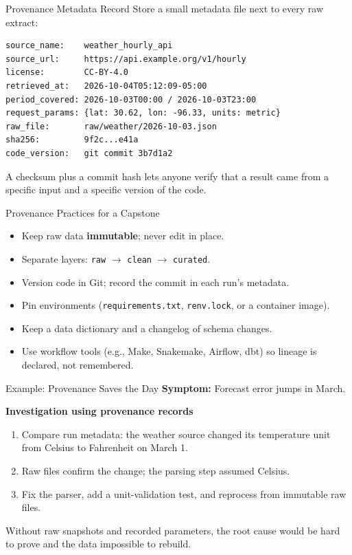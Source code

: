 \documentclass[aspectratio=43,11pt]{beamer}
\begin{document}
\begin{frame}[fragile]{Provenance Metadata Record}
  Store a small metadata file next to every raw extract:

  \medskip
  \footnotesize
\begin{verbatim}
source_name:    weather_hourly_api
source_url:     https://api.example.org/v1/hourly
license:        CC-BY-4.0
retrieved_at:   2026-10-04T05:12:09-05:00
period_covered: 2026-10-03T00:00 / 2026-10-03T23:00
request_params: {lat: 30.62, lon: -96.33, units: metric}
raw_file:       raw/weather/2026-10-03.json
sha256:         9f2c...e41a
code_version:   git commit 3b7d1a2
\end{verbatim}

  \normalsize
  A checksum plus a commit hash lets anyone verify that a result came from a
  specific input and a specific version of the code.
\end{frame}

\begin{frame}{Provenance Practices for a Capstone}
  \begin{itemize}
    \item Keep raw data \textbf{immutable}; never edit in place.
    \item Separate layers: \texttt{raw} $\rightarrow$ \texttt{clean} $\rightarrow$
      \texttt{curated}.
    \item Version code in Git; record the commit in each run's metadata.
    \item Pin environments (\texttt{requirements.txt}, \texttt{renv.lock}, or a
      container image).
    \item Keep a data dictionary and a changelog of schema changes.
    \item Use workflow tools (e.g., Make, Snakemake, Airflow, dbt) so lineage is
      declared, not remembered.
  \end{itemize}
\end{frame}

\begin{frame}{Example: Provenance Saves the Day}
  \textbf{Symptom:} Forecast error jumps in March.

  \medskip
  \textbf{Investigation using provenance records}
  \begin{enumerate}
    \item Compare run metadata: the weather source changed its temperature
      unit from Celsius to Fahrenheit on March 1.
    \item Raw files confirm the change; the parsing step assumed Celsius.
    \item Fix the parser, add a unit-validation test, and reprocess from
      immutable raw files.
  \end{enumerate}

  \medskip
  Without raw snapshots and recorded parameters, the root cause would be
  hard to prove and the data impossible to rebuild.
\end{frame}
\end{document}
